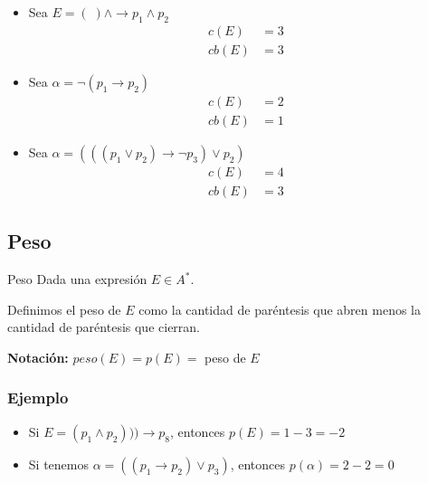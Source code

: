 \begin{itemize}
    \item Sea $E = ( \; ) \wedge \to p_1 \wedge p_2$
        \begin{align*}
            c(E) &= 3 \\
            cb(E) &= 3
        \end{align*}

    \item Sea $\alpha = \neg (p_1 \to p_2)$
        \begin{align*}
            c(E) &= 2 \\
            cb(E) &= 1
        \end{align*}

    \item Sea $\alpha = (((p_1 \vee p_2) \to \neg p_3) \vee p_2)$
        \begin{align*}
            c(E) &= 4 \\
            cb(E) &= 3
        \end{align*}
\end{itemize}

\subsection{Peso}

\begin{definicion}{Peso}{}
    Dada una expresión $E \in A^{*}$.

    \medskip

    Definimos el peso de $E$ como la cantidad de paréntesis que abren menos
    la cantidad de paréntesis que cierran.

    \bigskip
    \textbf{Notación:}
    $peso(E) = p(E) =$ peso de $E$
\end{definicion}

\subsubsection{Ejemplo}

\begin{itemize}
    \item Si $E = ( p_1 \wedge p_2))) \to p_8$, entonces $p(E)=1-3=-2$

    \item Si tenemos $\alpha = ((p_1 \to p_2) \vee p_3)$, entonces
        $p(\alpha) = 2-2=0$
\end{itemize}

